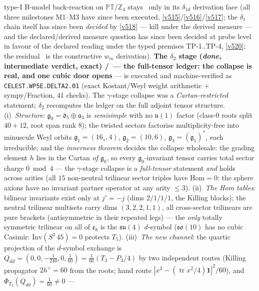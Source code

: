 \documentclass[11pt,a4paper]{article}
\newcommand{\Z}{\mathbb Z}
\begin{document}
\begin{itemize}
\begin{itemize}
type-I B-model back-reaction on $\mathbb{PT}/\Z_4$ stays \mO\ only in its $\delta_{1d}$
derivation face (all three milestones M1--M3 have since been executed,
\vref{v515}/\vref{v516}/\vref{v517}; the $\delta_1$ chain itself has since been
\emph{decided} by \vref{v518} --- kill under the derived measure --- and the declared/derived
measure question has since been decided at probe level in favour of the declared reading under
the typed premises TP-1..TP-4, \vref{v520}; the residual \mO\ is the constructive $w_m$
derivation).
\textbf{The $\delta_2$ stage (\emph{done}, intermediate verdict, exact) \mE/\mC\ --- the
full-tensor ledger: the collapse is real, and one cubic door opens} --- is executed and
machine-verified as \texttt{CELEST.WP5E.DELTA2.01}
 (exact Kostant/Weyl weight arithmetic $+$
sympy/Fraction, $41$ checks). The $\gamma$-stage collapse was a \emph{Cartan-restricted}
statement; $\delta_2$ recomputes the ledger on the full adjoint tensor structure.
(i)~\emph{Structure}: $\mathfrak g_0=\mathfrak d_5\oplus\mathfrak a_3$ is \emph{semisimple} with
no $\mathfrak u(1)$ factor (class-$0$ roots split $40{+}12$, root span rank $8$); the twisted
sectors factorise multiplicity-free into minuscule Weyl orbits $\mathfrak g_1=(16_s,4)$,
$\mathfrak g_2=(10,6)$, $\mathfrak g_3=(\mathfrak g_1)^*$, each irreducible; and the
\emph{innerness theorem} decides the collapse wholesale: the grading element $h$ lies in the
Cartan \emph{of} $\mathfrak g_0$, so every $\mathfrak g_0$-invariant tensor carries total sector
charge $0\bmod4$ --- the $\gamma$-stage collapse is a \emph{full-tensor} statement \emph{and}
holds across arities (all $15$ non-neutral trilinear sector triples have $\mathrm{Hom}=0$: the
sphere axions have no invariant partner operator at any arity $\le3$).
(ii)~\emph{The Hom tables}: bilinear invariants exist only at $j'=-j$ (dims $2/1/1/1$, the
Killing blocks); the neutral trilinear multisets carry dims $(3,2,2,1,1)$, all cross-sector
trilinears are pure brackets (antisymmetric in their repeated legs) --- the \emph{only} totally
symmetric trilinear on all of $\mathfrak e_8$ is the $\mathfrak{su}(4)$ $d$-symbol
($\mathfrak{so}(10)$ has no cubic Casimir: $\mathrm{Inv}(S^3\,45)=0$ protects $T_5$).
(iii)~\emph{The new channel}: the quartic projection of the $d$-symbol exchange is
$Q_{dd}=(0,0,-\tfrac1{240},0,\tfrac1{60})=\tfrac1{60}(T_3-P_3/4)$ by two independent routes
(Killing propagator $2h^\vee=60$ from the roots; hand route
$|x^2-(\operatorname{tr}x^2/4)\mathbf 1|^2/60$), and $\Phi_{T_3}(Q_{dd})=\tfrac1{60}\neq0$ ---

\end{itemize}
\end{itemize}
\end{document}
